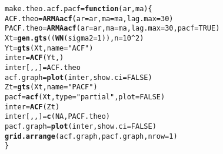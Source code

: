 \documentclass{article}\usepackage[]{graphicx}\usepackage[]{color}
\makeatletter
\newcommand{\hlnum}[1]{\textcolor[rgb]{0.686,0.059,0.569}{#1}}%
\newcommand{\hlstr}[1]{\textcolor[rgb]{0.192,0.494,0.8}{#1}}%
\newcommand{\hlopt}[1]{\textcolor[rgb]{0,0,0}{#1}}%
\newcommand{\hlstd}[1]{\textcolor[rgb]{0.345,0.345,0.345}{#1}}%
\newcommand{\hlkwa}[1]{\textcolor[rgb]{0.161,0.373,0.58}{\textbf{#1}}}%
\newcommand{\hlkwb}[1]{\textcolor[rgb]{0.69,0.353,0.396}{#1}}%
\newcommand{\hlkwc}[1]{\textcolor[rgb]{0.333,0.667,0.333}{#1}}%
\newcommand{\hlkwd}[1]{\textcolor[rgb]{0.737,0.353,0.396}{\textbf{#1}}}%
\newenvironment{kframe}{%
 \def\at@end@of@kframe{}%
 \ifinner\ifhmode%
  \def\at@end@of@kframe{\end{minipage}}%
  \begin{minipage}{\columnwidth}%
 \fi\fi%
 \def\FrameCommand##1{\hskip\@totalleftmargin \hskip-\fboxsep
 \colorbox{shadecolor}{##1}\hskip-\fboxsep
     \hskip-\linewidth \hskip-\@totalleftmargin \hskip\columnwidth}%
 \MakeFramed {\advance\hsize-\width
   \@totalleftmargin\z@ \linewidth\hsize
   \@setminipage}}%
 {\par\unskip\endMakeFramed%
 \at@end@of@kframe}
\newenvironment{knitrout}{}{} %
\makeatother
\begin{document}
\begin{knitrout}
\begin{kframe}
\begin{alltt}
\hlstd{make.theo.acf.pacf} \hlkwb{=} \hlkwa{function}\hlstd{(}\hlkwc{ar}\hlstd{,} \hlkwc{ma}\hlstd{)\{}
 \hlstd{ACF.theo} \hlkwb{=} \hlkwd{ARMAacf}\hlstd{(}\hlkwc{ar} \hlstd{= ar,} \hlkwc{ma} \hlstd{= ma,} \hlkwc{lag.max} \hlstd{=} \hlnum{30}\hlstd{)}
 \hlstd{PACF.theo} \hlkwb{=} \hlkwd{ARMAacf}\hlstd{(}\hlkwc{ar} \hlstd{= ar,} \hlkwc{ma} \hlstd{= ma,} \hlkwc{lag.max} \hlstd{=} \hlnum{30}\hlstd{,} \hlkwc{pacf} \hlstd{=} \hlnum{TRUE}\hlstd{)}
 \hlstd{Xt} \hlkwb{=} \hlkwd{gen.gts}\hlstd{((}\hlkwd{WN}\hlstd{(}\hlkwc{sigma2} \hlstd{=} \hlnum{1}\hlstd{)),} \hlkwc{n} \hlstd{=} \hlnum{10}\hlopt{^}\hlnum{2}\hlstd{)}
 \hlstd{Yt} \hlkwb{=} \hlkwd{gts}\hlstd{(Xt,} \hlkwc{name} \hlstd{=} \hlstr{"ACF"}\hlstd{)}
 \hlstd{inter} \hlkwb{=} \hlkwd{ACF}\hlstd{(Yt,)}
 \hlstd{inter[,,]} \hlkwb{=} \hlstd{ACF.theo}
 \hlstd{acf.graph} \hlkwb{=} \hlkwd{plot}\hlstd{(inter,} \hlkwc{show.ci} \hlstd{=} \hlnum{FALSE}\hlstd{)}
 \hlstd{Zt} \hlkwb{=} \hlkwd{gts}\hlstd{(Xt,} \hlkwc{name} \hlstd{=} \hlstr{"PACF"}\hlstd{)}
 \hlstd{pacf} \hlkwb{=} \hlkwd{acf}\hlstd{(Xt,} \hlkwc{type} \hlstd{=} \hlstr{"partial"}\hlstd{,} \hlkwc{plot} \hlstd{=} \hlnum{FALSE}\hlstd{)}
 \hlstd{inter} \hlkwb{=} \hlkwd{ACF}\hlstd{(Zt)}
 \hlstd{inter[,,]} \hlkwb{=} \hlkwd{c}\hlstd{(}\hlnum{NA}\hlstd{,PACF.theo)}
 \hlstd{pacf.graph} \hlkwb{=} \hlkwd{plot}\hlstd{(inter,} \hlkwc{show.ci} \hlstd{=} \hlnum{FALSE}\hlstd{)}
 \hlkwd{grid.arrange}\hlstd{(acf.graph,pacf.graph,} \hlkwc{nrow} \hlstd{=} \hlnum{1}\hlstd{)}
\hlstd{\}}
\end{alltt}
\end{kframe}
\end{knitrout}
\end{document}
